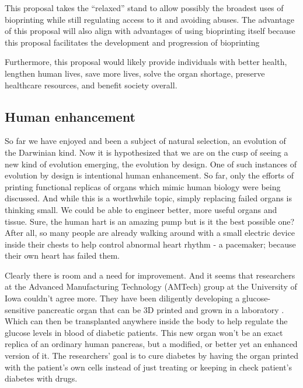 \documentclass[12pt]{article} %
\begin{document}
This proposal takes the “relaxed” stand to allow possibly the
broadest uses of bioprinting while still regulating access to it and
avoiding abuses. The advantage of this proposal will also align
with advantages of using bioprinting itself because this proposal
facilitates the development and progression of bioprinting






Furthermore, this proposal
would likely provide individuals with better health, lengthen
human lives, save more lives, solve the organ shortage, preserve
healthcare resources, and benefit society overall.



\subsection{Human enhancement} %

So far we have enjoyed and been a subject of natural selection, an evolution of the Darwinian kind. Now it is hypothesized that we are on the cusp of seeing a new kind of evolution emerging, the evolution by design. One of such instances of evolution by design is intentional human enhancement. So far, only the efforts of printing functional replicas of organs which mimic human biology were being discussed. And while this is a worthwhile topic, simply replacing failed organs is thinking small. We could be able to engineer better, more useful organs and tissue. Sure, the human hart is an amazing pump but is it the best possible one?  After all, so many people \cite{Wood:2002} are already walking around with a small electric device inside their chests to help control abnormal heart rhythm - a pacemaker; because their own heart has failed them.

Clearly there is room and a need for improvement. And it seems that researchers at the Advanced Manufacturing Technology (AMTech) group at the University of Iowa couldn't agree more. They have been diligently developing a glucose-sensitive pancreatic organ that can be 3D printed and grown in a laboratory \cite{Ozbolat:2013}. Which can then be transplanted anywhere inside the body to help regulate the glucose levels in blood of diabetic patients. This new organ won't be an exact replica of an ordinary human pancreas, but a modified, or better yet an enhanced version of it. The researchers' goal is to cure diabetes by having the organ printed with the patient's own cells instead of just treating or keeping in check patient's diabetes with drugs.
\end{document}
